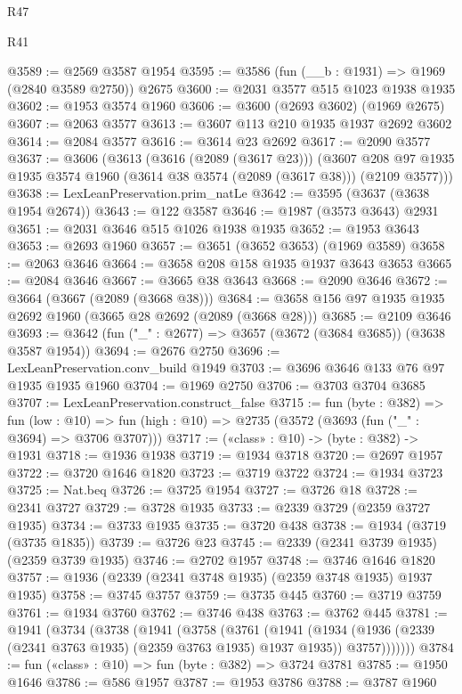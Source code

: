 \begin{lexlean}{R47}
\begin{lexlean}{R41}
\begin{coremodule}
{{{{{{{{{{{{{{{{{{{{{{{{{{{{{{{{{{{{{{{{{{{{{{{{{{{{{{{{{{{{{{{{{{{{{{{{{{{{{{{{{{{{{{{@3589 := @2569 @3587 @1954
@3595 := @3586 (fun (__b : @1931) => @1969 (@2840 @3589 @2750)) @2675
@3600 := @2031 @3577 @515 @1023 @1938 @1935
@3602 := @1953 @3574 @1960
@3606 := @3600 (@2693 @3602) (@1969 @2675)
@3607 := @2063 @3577
@3613 := @3607 @113 @210 @1935 @1937 @2692 @3602
@3614 := @2084 @3577
@3616 := @3614 @23 @2692
@3617 := @2090 @3577
@3637 := @3606
    (@3613
      (@3616 (@2089 (@3617 @23)))
      (@3607 @208 @97 @1935 @1935 @3574 @1960 (@3614 @38 @3574 (@2089 (@3617 @38))) (@2109 @3577)))
@3638 := LexLeanPreservation.prim_natLe
@3642 := @3595 (@3637 (@3638 @1954 @2674))
@3643 := @122 @3587
@3646 := @1987 (@3573 @3643) @2931
@3651 := @2031 @3646 @515 @1026 @1938 @1935
@3652 := @1953 @3643
@3653 := @2693 @1960
@3657 := @3651 (@3652 @3653) (@1969 @3589)
@3658 := @2063 @3646
@3664 := @3658 @208 @158 @1935 @1937 @3643 @3653
@3665 := @2084 @3646
@3667 := @3665 @38 @3643
@3668 := @2090 @3646
@3672 := @3664 (@3667 (@2089 (@3668 @38)))
@3684 := @3658 @156 @97 @1935 @1935 @2692 @1960 (@3665 @28 @2692 (@2089 (@3668 @28)))
@3685 := @2109 @3646
@3693 := @3642 (fun ("_" : @2677) => @3657 (@3672 (@3684 @3685)) (@3638 @3587 @1954))
@3694 := @2676 @2750
@3696 := LexLeanPreservation.conv_build @1949
@3703 := @3696 @3646 @133 @76 @97 @1935 @1935 @1960
@3704 := @1969 @2750
@3706 := @3703 @3704 @3685
@3707 := LexLeanPreservation.construct_false
@3715 := fun (byte : @382) =>
  fun (low : @10) => fun (high : @10) => @2735 (@3572 (@3693 (fun ("_" : @3694) => @3706 @3707)))
@3717 := («class» : @10) -> (byte : @382) -> @1931
@3718 := @1936 @1938
@3719 := @1934 @3718
@3720 := @2697 @1957
@3722 := @3720 @1646 @1820
@3723 := @3719 @3722
@3724 := @1934 @3723
@3725 := Nat.beq
@3726 := @3725 @1954
@3727 := @3726 @18
@3728 := @2341 @3727
@3729 := @3728 @1935
@3733 := @2339 @3729 (@2359 @3727 @1935)
@3734 := @3733 @1935
@3735 := @3720 @438
@3738 := @1934 (@3719 (@3735 @1835))
@3739 := @3726 @23
@3745 := @2339 (@2341 @3739 @1935) (@2359 @3739 @1935)
@3746 := @2702 @1957
@3748 := @3746 @1646 @1820
@3757 := @1936 (@2339 (@2341 @3748 @1935) (@2359 @3748 @1935) @1937 @1935)
@3758 := @3745 @3757
@3759 := @3735 @445
@3760 := @3719 @3759
@3761 := @1934 @3760
@3762 := @3746 @438
@3763 := @3762 @445
@3781 := @1941
    (@3734
      (@3738
        (@1941
          (@3758
            (@3761
              (@1941
                (@1934
                  (@1936 (@2339 (@2341 @3763 @1935) (@2359 @3763 @1935) @1937 @1935))
                  @3757)))))))
@3784 := fun («class» : @10) => fun (byte : @382) => @3724 @3781
@3785 := @1950 @1646
@3786 := @586 @1957
@3787 := @1953 @3786
@3788 := @3787 @1960
}}}}}}}}}}}}}}}}}}}}}}}}}}}}}}}}}}}}}}}}}}}}}}}}}}}}}}}}}}}}}}}}}}}}}}}}}}}}}}}}}}}}}}}
\end{coremodule}
\end{lexlean}
\end{lexlean}
